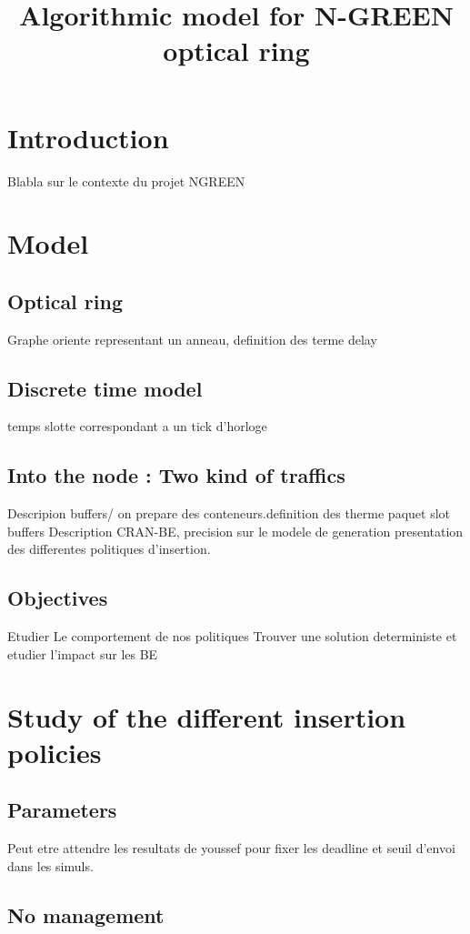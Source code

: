 \documentclass[a4paper,10pt]{article}
\title{Algorithmic model for N-GREEN optical ring}
\begin{document}
\maketitle
\section{Introduction}
Blabla sur le contexte du projet NGREEN



\section{Model}
  \label{model}
  \subsection{Optical ring}
    Graphe oriente representant un anneau, definition des terme delay
  \subsection{Discrete time model}
    temps slotte correspondant a un tick d'horloge
  \subsection{Into the node : Two kind of traffics}
    Descripion buffers/ on prepare des conteneurs.definition des therme paquet slot buffers
    Description CRAN-BE, precision sur le modele de generation
    presentation des differentes politiques d'insertion.

  \subsection{Objectives}
    Etudier Le comportement de nos politiques
    Trouver une solution deterministe et etudier l'impact sur les BE
    
\section{Study of the different insertion policies}

  \subsection{Parameters}
  Peut etre attendre les resultats de youssef pour fixer les deadline et seuil d'envoi dans les simuls.
  \subsection{No management}
\end{document}

